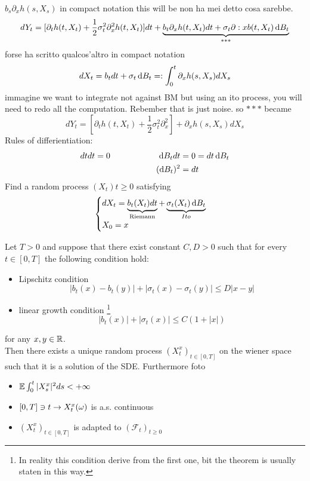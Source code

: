 $b_s \partial_x h(s, X_s)$ in compact notation this will be non ha mei detto cosa sarebbe.
\begin{equation*}
	 dY_t = [\partial _t h(t,X_t) + \frac{1}{2}\sigma^2_t \partial_x^2h(t,X_t)]dt + \underbrace{b_t \partial_x h(t,X_t) dt + \sigma_t \partial :x b(t, X_t) \mathop{}\!\mathrm{d} B_t}_{***}
\end{equation*}
forse ha scritto qualcos'altro in compact notation 
\begin{equation*}
	dX_t = b_t dt + \sigma_t \mathop{}\!\mathrm{d} B_t =: \int_0^t \partial_x h(s, X_s) dX_s 
\end{equation*}
immagine we want to integrate not against BM but using an ito process, you will need to redo all the computation. Rebember that is just noise. 
so $***$ became 
\begin{equation*}
	dY_t = [\partial_t h(t,X_t)+ \frac{1}{2}\sigma_t^2 \partial^2_x ]+\partial_x h(s, X_s) dX_s  
\end{equation*}
Rules of differientiation:
\begin{equation*}
	\begin{split}
		dtdt=0 \hspace{2 cm} \mathop{}\!\mathrm{d} B_t dt& = 0= dt\mathop{}\!\mathrm{d} B_t \\
		(\mathop{}\!\mathrm{d} B_t)^2&= dt
	\end{split}
\end{equation*}
Find a random process $(X_t){t\geq 0}$ satisfying 
\begin{equation*}
	\begin{cases}
		dX_t = \underbrace{b_t(X_t)dt }_{\text{Riemann}}+ \underbrace{\sigma_t (X_t)\mathop{}\!\mathrm{d} B_t } _{Ito}\\
		X_0=x
	\end{cases}
\end{equation*}
\begin{Th}
	Let $T>0$ and suppose that there exist constant $C,D>0$ such that for every $t \in [0,T]$ the following condition hold:
	\begin{itemize}
		\item Lipschitz condition
		\begin{equation*}
			|b_t(x)-b_t(y)|+|\sigma_t(x)-\sigma_t(y)|\leq D|x-y|
		\end{equation*}
		\item linear growth condition \footnote{In reality this condition derive from the first one, bit the theorem is usually staten in this way. }
		\begin{equation*}
			|b_t(x)|+|\sigma_t(x)|\leq C(1+|x|)
		\end{equation*}
		
	\end{itemize}
	for any $x,y\in \mathbb{R}$.\\
	Then there exists a unique random process $(X_t^x)_{t \in [0,T]}$ on the wiener space such that it is a solution of the SDE. Furthermore foto
	\begin{itemize}
		\item $\mathbb{E} \int_0^t |X^x_s|^2 ds < + \infty$
		\item $[0,T]\ni t \rightarrow X_t^x(\omega)$ is a.s. continuous
		\item $(X_t^x)_{t \in [0,T]}$ is adapted to $(\mathcal{F}_t)_{t \geq 0}$
	\end{itemize}
\end{Th}
